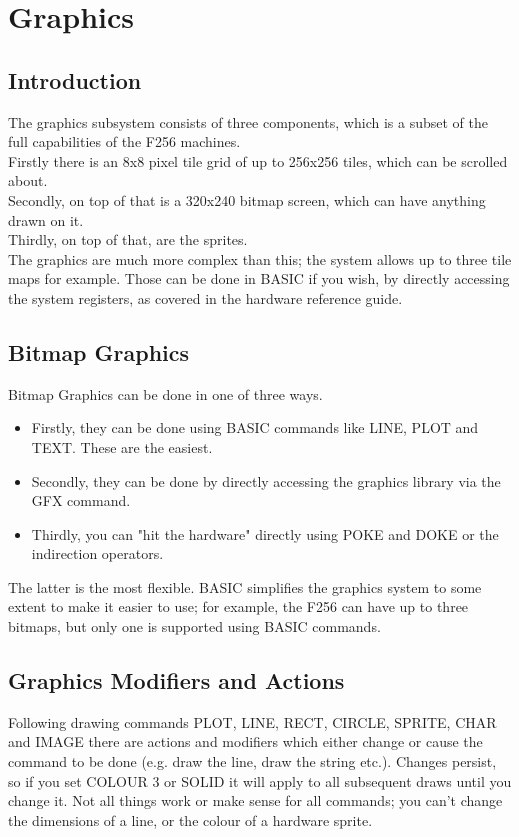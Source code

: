 \chapter{Graphics}
\label{chap:graphics}

\section{Introduction}

The graphics subsystem consists of three components, which is a subset of the full capabilities of the F256 machines.\\

Firstly there is an 8x8 pixel tile grid of up to 256x256 tiles, which can be scrolled about.\\

Secondly, on top of that is a 320x240 bitmap screen, which can have anything drawn on it.\\

Thirdly, on top of that, are the sprites.\\

The graphics are much more complex than this; the system allows up to three tile maps for example. Those can be done in BASIC if you wish, by directly accessing the system registers, as covered in the hardware reference guide.\\

\section{Bitmap Graphics}

Bitmap Graphics can be done in one of three ways.

\begin{itemize}
\item Firstly, they can be done using BASIC commands like LINE, PLOT and TEXT. These are the easiest.
\item Secondly, they can be done by directly accessing the graphics library via the GFX command.
\item Thirdly, you can "hit the hardware" directly using POKE and DOKE or the indirection operators.
\end{itemize}
The latter is the most flexible. BASIC simplifies the graphics system to some extent to make it easier to use; for example, the F256 can have up to three bitmaps, but only one is supported using BASIC commands.

\section{Graphics Modifiers and Actions}
Following drawing commands PLOT, LINE, RECT, CIRCLE, SPRITE, CHAR and IMAGE there are actions and modifiers which either change or cause the command to be done (e.g. draw the line, draw the string etc.).
Changes persist, so if you set COLOUR 3 or SOLID it will apply to all subsequent draws until you change it.
Not all things work or make sense for all commands; you can’t change the dimensions of a line, or the colour of a hardware sprite.

